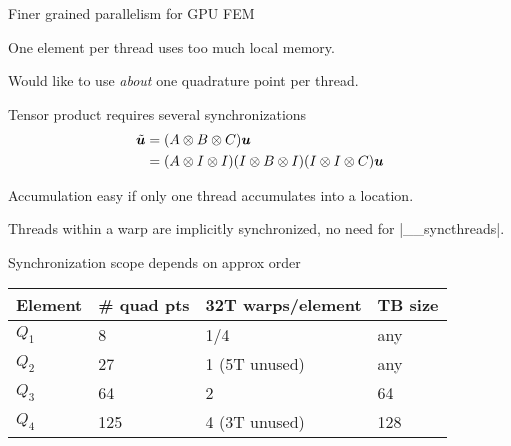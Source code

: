 \begin{frame}[fragile]{Finer grained parallelism for GPU FEM}
  \begin{itemize*}
  \item One element per thread uses too much local memory.
  \item Would like to use \emph{about} one quadrature point per thread.
  \item Tensor product requires several synchronizations
    \begin{align*}
      \tilde{\bm u} &= (A \otimes B \otimes C) \bm u \\
      &= (A \otimes I \otimes I) (I \otimes B \otimes I) (I \otimes I \otimes C) \bm u
    \end{align*}
  \item Accumulation easy if only one thread accumulates into a location.
  \item Threads within a warp are implicitly synchronized, no need for \cfunc|__syncthreads|.
  \item Synchronization scope depends on approx order
    \begin{tabular}{llll}
      \toprule
      Element & \# quad pts & 32T warps/element & TB size \\
      \midrule
      $Q_1$ & 8 & 1/4 & any \\
      $Q_2$ & 27 & 1 (5T unused) & any \\
      $Q_3$ & 64 & 2 & 64 \\
      $Q_4$ & 125 & 4 (3T unused) & 128 \\
      \bottomrule
    \end{tabular}
  \end{itemize*}
\end{frame}
